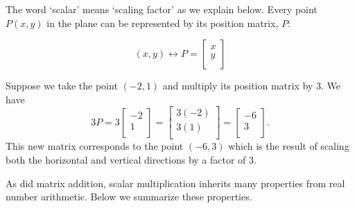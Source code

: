 \documentclass{ximera}
\begin{document}
\smallskip


The word  `scalar' means `scaling factor' as we  explain below.  Every point $P(x,y)$ in the plane can be represented by its position matrix, $P$:

\[ (x,y) \leftrightarrow P = \left[ \begin{array}{r} x \\ y \\ \end{array} \right] \]
 
Suppose we take the point $(-2,1)$ and multiply its position matrix by $3$.  We have\[ 3P = 3 \left[ \begin{array}{r} -2 \\ 1 \\ \end{array} \right] = \left[ \begin{array}{r} 3(-2) \\ 3(1) \\ \end{array} \right] = \left[ \begin{array}{r} -6 \\ 3 \\ \end{array} \right].\] This new matrix corresponds to the point $(-6,3)$ which is the result of scaling  both the horizontal and vertical directions by a factor of $3$. 


As did matrix addition, scalar multiplication inherits many properties from real number arithmetic.  Below we summarize these properties.
\end{document}
